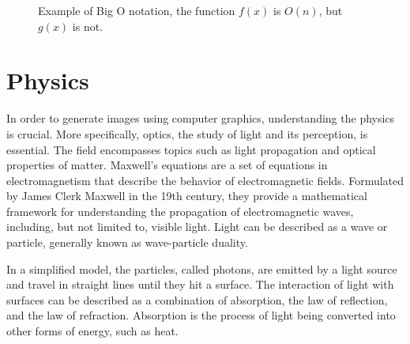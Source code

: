 \begin{figure}[H]
  \centering
  \caption{Example of Big O notation, the function $f(x)$ is $O(n)$, but $g(x)$ is not.}
  \label{fig:big-o-visualization}
\end{figure}

\section{Physics}
\label{ch:physics}

In order to generate images using computer graphics, understanding the physics is crucial. More specifically, optics, the study of light and its perception, is essential. The field encompasses topics such as light propagation and optical properties of matter. Maxwell's equations are a set of equations in electromagnetism that describe the behavior of electromagnetic fields. Formulated by James Clerk Maxwell in the 19th century, they provide a mathematical framework for understanding the propagation of electromagnetic waves, including, but not limited to, visible light. Light can be described as a wave or particle, generally known as wave-particle duality. \cite{fowles1989introduction}

In a simplified model, the particles, called photons, are emitted by a light source and travel in straight lines until they hit a surface. The interaction of light with surfaces can be described as a combination of absorption, the law of reflection, and the law of refraction. Absorption is the process of light being converted into other forms of energy, such as heat.

